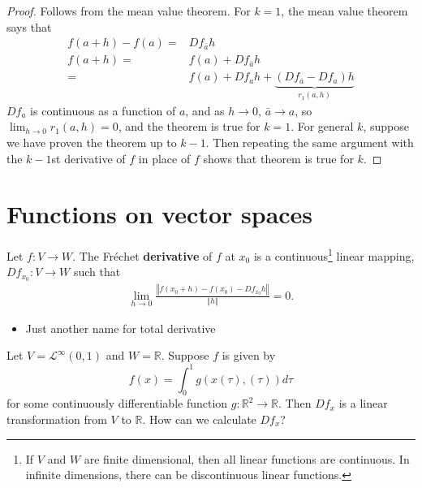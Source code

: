 \documentclass[compress]{beamer}
\def\R{\mathbb{R}}
\newcommand{\norm}[1]{\left\Vert {#1} \right\Vert}
\renewcommand{\to}{{\rightarrow}}
\begin{document}
\begin{frame}
  \begin{proof}
    Follows from the mean value theorem. For $k=1$, the mean value
    theorem says that
    \begin{align*}
      f(a+h) - f(a) = & Df_{\bar{a}} h \\
      f(a+h) = & f(a) + Df_{\bar{a}} h \\
      = & f(a) + Df_{a} h + \underbrace{(Df_{\bar{a}} -Df_a)h}_{r_1(a,h)}  
    \end{align*}
    $Df_a$ is continuous as a function of $a$, and as $h \to 0$,
    $\bar{a} \to a$, so $\lim_{h \to 0} r_1(a,h) = 0$, and the theorem
    is true for $k = 1$. For general $k$, suppose we have proven the
    theorem up to $k-1$. Then repeating the same argument with the
    $k-1$st derivative of $f$ in place of $f$ shows that theorem is true
    for $k$. 
  \end{proof}
\end{frame}

\section{Functions on vector spaces}

\begin{frame}
  \begin{definition}
    Let $f: V \to W$. The Fr\'{e}chet \textbf{derivative} of $f$ at
    $x_0$ is a continuous\footnote{If $V$
      and $W$ are finite dimensional, then all linear functions are
      continuous. In infinite dimensions, there can be discontinuous
      linear functions.} linear mapping, $Df_{x_0}: V \to W$ such that
    \begin{align*}
      \lim_{h \to 0} \frac{\left\Vert f(x_0 + h) - f(x_0) - Df_{x_0}
          h\right\Vert} {\norm{h}} = 0. 
    \end{align*}
  \end{definition}
  \begin{itemize}
  \item Just another name for total derivative
  \end{itemize}
\end{frame}

\begin{frame}
  \begin{example}\label{ex:fre}
    Let $V = \mathcal{L}^\infty(0,1)$ and $W = \R$. Suppose $f$ is given by
    \[ f(x) = \int_0^1 g(x(\tau),(\tau)) d\tau \] 
    for some continuously differentiable function $g:\R^2 \to
    \R$. 
    Then $Df_{x}$ is a linear transformation from $V$ to $\R$. How
    can we calculate $Df_x$?  
  \end{example}
\end{frame}
\end{document}
